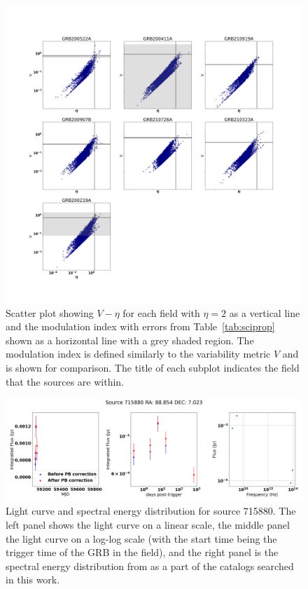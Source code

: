 \documentclass[12pt]{article}
\begin{document}
\begin{figure}
	\includegraphics[width=\textwidth]{allfieldsvar.png}
	\caption{Scatter plot showing $V-\eta$ for each field with $\eta=2$ as a vertical line and the modulation index with errors from Table~\ref{tab:sciprop} shown as a horizontal line with a grey shaded region. The modulation index is defined similarly to the variability metric $V$ and is shown for comparison. The title of each subplot indicates the field that the sources are within.}
	\label{fig:allfieldsvar}
\end{figure}

\begin{figure}
	\includegraphics[width=\textwidth]{src715880lc4.png}
	\caption{Light curve and spectral energy distribution for source 715880. The left panel shows the light curve on a linear scale, the middle panel the light curve on a log-log scale (with the start time being the trigger time of the GRB in the field), and the right panel is the spectral energy distribution from \citet{2008AJ....136..735L}  as a part of the catalogs searched in this work.}
	\label{fig:src715880lc4.png}
\end{figure}
\end{document}
